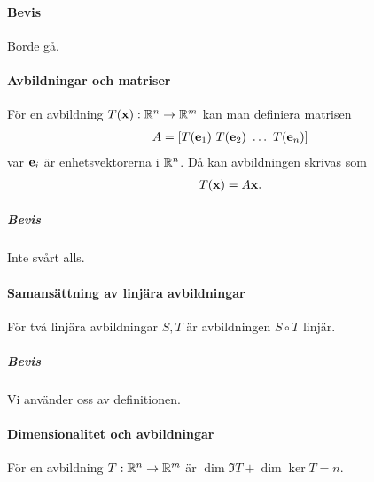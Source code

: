 \paragraph{Bevis}
Borde gå.

\paragraph{Avbildningar och matriser}
För en avbildning $T(\vect{x}): \R^n\to\R^m$ kan man definiera matrisen
\begin{align*}
	A = \left[ T(\vect{e}_1) ~ T(\vect{e}_2) ~ \dots ~ T(\vect{e}_n) \right]
\end{align*}
var $\vect{e}_i$ är enhetsvektorerna i $\mathbb{R}^n$. Då kan avbildningen skrivas som
\begin{align*}
	T(\vect{x}) = A\vect{x}.
\end{align*}

\subparagraph{Bevis}
Inte svårt alls.

\paragraph{Samansättning av linjära avbildningar}
För två linjära avbildningar $S, T$ är avbildningen $S\circ T$ linjär.

\subparagraph{Bevis}
Vi använder oss av definitionen.

\paragraph{Dimensionalitet och avbildningar}
För en avbildning $T: \mathbb{R}^n\to\mathbb{R}^m$ är $\dim{\Im T} + \dim{\ker{T}} = n$.